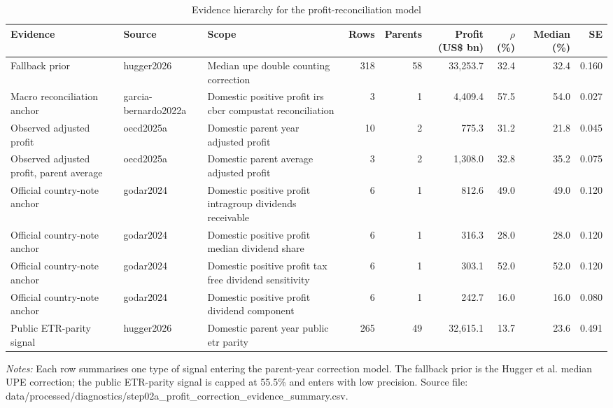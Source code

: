 \begin{table}[H]
\centering
\scriptsize
\caption{Evidence hierarchy for the profit-reconciliation model}
\label{tab:profit_correction_evidence_table}
\begin{adjustbox}{max width=\textwidth,center}
\begin{tabular}{@{}L{2.8cm}L{1.8cm}L{3.4cm}rrrrrr@{}}
\toprule
Evidence & Source & Scope & Rows & Parents & Profit (US\$ bn) & $\rho$ (\%) & Median (\%) & SE \\
\midrule
Fallback prior & hugger2026 & Median upe double counting correction & 318 & 58 & 33,253.7 & 32.4 & 32.4 & 0.160 \\
Macro reconciliation anchor & garcia-bernardo2022a & Domestic positive profit irs cbcr compustat reconciliation &   3 &  1 &  4,409.4 & 57.5 & 54.0 & 0.027 \\
Observed adjusted profit & oecd2025a & Domestic parent year adjusted profit &  10 &  2 &    775.3 & 31.2 & 21.8 & 0.045 \\
Observed adjusted profit, parent average & oecd2025a & Domestic parent average adjusted profit &   3 &  2 &  1,308.0 & 32.8 & 35.2 & 0.075 \\
Official country-note anchor & godar2024 & Domestic positive profit intragroup dividends receivable &   6 &  1 &    812.6 & 49.0 & 49.0 & 0.120 \\
Official country-note anchor & godar2024 & Domestic positive profit median dividend share &   6 &  1 &    316.3 & 28.0 & 28.0 & 0.120 \\
Official country-note anchor & godar2024 & Domestic positive profit tax free dividend sensitivity &   6 &  1 &    303.1 & 52.0 & 52.0 & 0.120 \\
Official country-note anchor & godar2024 & Domestic positive profit dividend component &   6 &  1 &    242.7 & 16.0 & 16.0 & 0.080 \\
Public ETR-parity signal & hugger2026 & Domestic parent year public etr parity & 265 & 49 & 32,615.1 & 13.7 & 23.6 & 0.491 \\
\bottomrule
\end{tabular}
\end{adjustbox}

\vspace{0.5em}
\begin{minipage}{0.96\textwidth}
\footnotesize\raggedright \textit{Notes:} Each row summarises one type of signal entering the parent-year correction model. The fallback prior is the Hugger et al. median UPE correction; the public ETR-parity signal is capped at 55.5\% and enters with low precision. Source file: data/processed/diagnostics/step02a\_profit\_correction\_evidence\_summary.csv.
\end{minipage}
\end{table}
